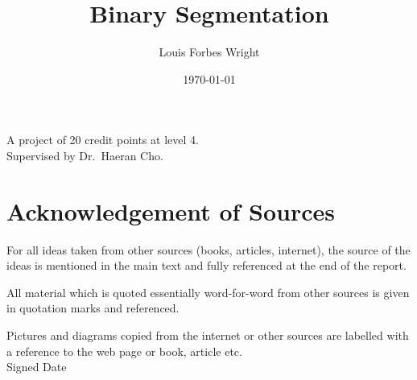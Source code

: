 \documentclass[a4paper, 12pt, notitlepage]{report}
\title{Binary Segmentation}
\author{Louis Forbes Wright}
\date{\today}
\begin{document}
\maketitle





%


\begin{center}
A project of 20 credit points at level 4. %
\\[12pt]
Supervised by Dr.\ Haeran Cho. 
\end{center}
\thispagestyle{empty}
\newpage
\section*{Acknowledgement of Sources} %
For all ideas taken from other sources (books, articles, internet), the source of the ideas is mentioned in the main text and fully referenced at the end of the report.

All material which is quoted essentially word-for-word from other sources is given in quotation marks and referenced.

Pictures and diagrams copied from the internet or other sources are labelled with a reference to the web page or book, article etc.
\\[12pt]
Signed \dotfill Date \dotfill

\newpage
\end{document}
